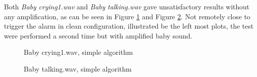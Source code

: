 Both \emph{Baby crying1.wav} and \emph{Baby talking.wav} gave unsatisfactory results without any amplification, as 
can be seen in Figure \ref{fig:bc2_simp} and Figure \ref{fig:bt_simp}. Not remotely close to trigger the alarm in clean
configuration, illustrated be the left most plots, the test were performed a second time but with amplified baby sound.


\begin{figure}[H]
  \centering
  \caption{Baby crying1.wav, simple algorithm}
  \label{fig:bc2_simp}
\end{figure}
\begin{figure}[H]
  \centering
  \caption{Baby talking.wav, simple algorithm}
  \label{fig:bt_simp}
\end{figure}


